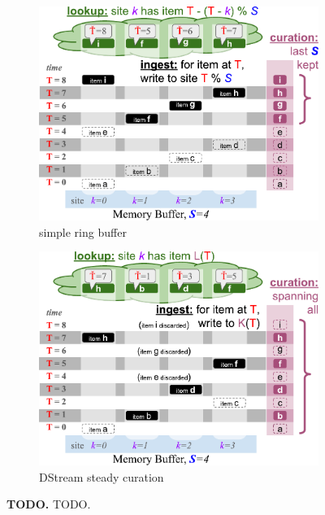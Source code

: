 \begin{figure}

\begin{subfigure}{0.5\linewidth}
\centering
\includegraphics[width=0.92\linewidth]{img/curation-ingest-lookup-ring}
\caption{simple ring buffer}
\label{fig:curation-ingest-lookup:ring}
\end{subfigure}%
\begin{subfigure}{0.5\linewidth}
\centering
\includegraphics[width=0.92\linewidth]{img/curation-ingest-lookup-steady}
\caption{DStream steady curation}
\label{fig:curation-ingest-lookup:steady}
\end{subfigure}%

\caption{
  \textbf{TODO.}
  \footnotesize
  TODO.
}
\label{fig:curation-ingest-lookup}
\end{figure}
